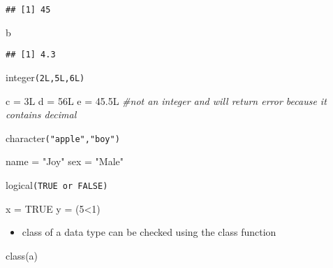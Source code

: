 \documentclass[
]{article}
\newenvironment{Shaded}{\begin{snugshade}}{\end{snugshade}}
\newcommand{\CommentTok}[1]{\textcolor[rgb]{0.56,0.35,0.01}{\textit{#1}}}
\newcommand{\ConstantTok}[1]{\textcolor[rgb]{0.00,0.00,0.00}{#1}}
\newcommand{\DecValTok}[1]{\textcolor[rgb]{0.00,0.00,0.81}{#1}}
\newcommand{\FloatTok}[1]{\textcolor[rgb]{0.00,0.00,0.81}{#1}}
\newcommand{\FunctionTok}[1]{\textcolor[rgb]{0.00,0.00,0.00}{#1}}
\newcommand{\NormalTok}[1]{#1}
\newcommand{\OtherTok}[1]{\textcolor[rgb]{0.56,0.35,0.01}{#1}}
\newcommand{\SpecialCharTok}[1]{\textcolor[rgb]{0.00,0.00,0.00}{#1}}
\newcommand{\StringTok}[1]{\textcolor[rgb]{0.31,0.60,0.02}{#1}}
\providecommand{\tightlist}{%
  \setlength{\itemsep}{0pt}\setlength{\parskip}{0pt}}
\begin{document}
\begin{verbatim}
## [1] 45
\end{verbatim}

\begin{Shaded}
\begin{Highlighting}[]
\NormalTok{b}
\end{Highlighting}
\end{Shaded}

\begin{verbatim}
## [1] 4.3
\end{verbatim}

integer\texttt{(2L,5L,6L)}

\begin{Shaded}
\begin{Highlighting}[]
\NormalTok{c }\OtherTok{=}\NormalTok{ 3L}
\NormalTok{d }\OtherTok{=}\NormalTok{ 56L}
\NormalTok{e }\OtherTok{=} \FloatTok{45.5}\NormalTok{L }\CommentTok{\#not an integer and will return error because it contains decimal }
\end{Highlighting}
\end{Shaded}

character\texttt{("apple","boy")}

\begin{Shaded}
\begin{Highlighting}[]
\NormalTok{name }\OtherTok{=} \StringTok{"Joy"}
\NormalTok{sex }\OtherTok{=} \StringTok{"Male"}
\end{Highlighting}
\end{Shaded}

logical\texttt{(TRUE\ or\ FALSE)}

\begin{Shaded}
\begin{Highlighting}[]
\NormalTok{x }\OtherTok{=} \ConstantTok{TRUE}
\NormalTok{y }\OtherTok{=}\NormalTok{ (}\DecValTok{5}\SpecialCharTok{\textless{}}\DecValTok{1}\NormalTok{)}
\end{Highlighting}
\end{Shaded}

\begin{itemize}
\tightlist
\item
  class of a data type can be checked using the class function
\end{itemize}

\begin{Shaded}
\begin{Highlighting}[]
\FunctionTok{class}\NormalTok{(a)}
\end{Highlighting}
\end{Shaded}
\end{document}
